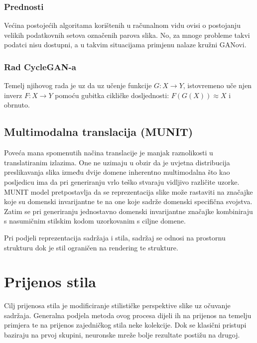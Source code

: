 \documentclass[lmodern, utf8, seminar]{fer}
\begin{document}
\subsection{Prednosti}
Većina postojećih algoritama korištenih u računalnom vidu ovisi o postojanju velikih podatkovnih setova označenih parova slika. No, za mnoge probleme takvi podatci nisu dostupni, a u takvim situacijama primjenu nalaze kružni GANovi.
\newline

\subsection{Rad CycleGAN-a}
Temelj njihovog rada je uz da uz učenje funkcije $G: X \rightarrow Y$, istovremeno uče njen inverz $F: X \rightarrow Y$ pomoću gubitka cikličke dosljednosti: $F(G(X)) \approx X$ i obrnuto.

\section{Multimodalna translacija (MUNIT)}
Poveća mana spomenutih načina translacije je manjak raznolikosti u translatiranim izlazima. One ne uzimaju u obzir da je uvjetna distribucija preslikavanja slika između dvije domene inherentno multimodalna \cite{huang2018multimodal} što kao posljedicu ima da pri generiranju vrlo teško stvaraju vidljivo različite uzorke. MUNIT model pretpostavlja da se reprezentacija slike može rastaviti na značajke koje su domenski invarijantne te na one koje sadrže domenski specifična svojstva. Zatim se pri generiranju jednostavno domenski invarijantne značajke kombiniraju s nasumičnim stilskim kodom uzorkovanim s ciljne domene.
\newline

Pri podjeli reprezentacija sadržaja i stila, sadržaj se odnosi na prostornu strukturu dok je stil ograničen na rendering te strukture.


\chapter{Prijenos stila}
Cilj prijenosa stila je modificiranje stilističke perspektive slike uz očuvanje sadržaja. Generalna podjela metoda ovog procesa dijeli ih na prijenos na temelju primjera te na prijenos zajedničkog stila neke kolekcije. Dok se klasični pristupi baziraju na prvoj skupini, neuronske mreže bolje rezultate postižu na drugoj.
\end{document}
